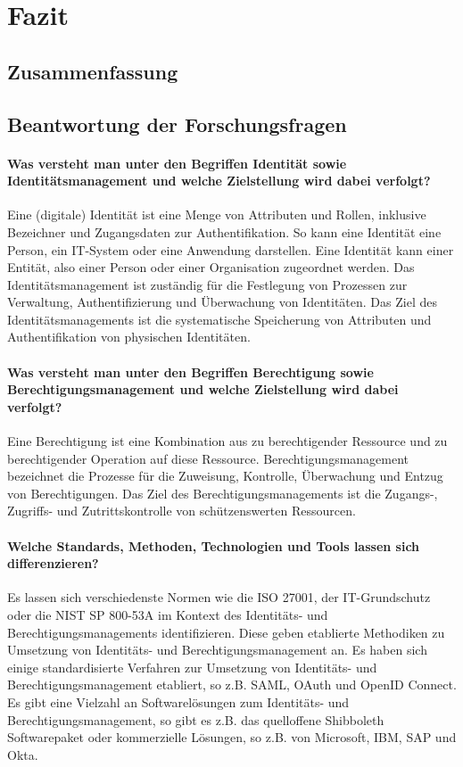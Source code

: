 \documentclass[11pt]{article}
\begin{document}
\section{Fazit}
\subsection{Zusammenfassung}
\subsection{Beantwortung der Forschungsfragen}
\paragraph{Was versteht man unter den Begriffen \glqq{}Identität\grqq{} sowie \glqq{}Identitätsmanagement\grqq{} und welche Zielstellung wird dabei verfolgt?}
Eine (digitale) Identität ist eine Menge von Attributen und Rollen, inklusive Bezeichner und Zugangsdaten zur Authentifikation. So kann eine Identität eine Person, ein IT-System oder eine Anwendung darstellen. Eine Identität kann einer Entität, also einer Person oder einer Organisation zugeordnet werden. Das Identitätsmanagement ist zuständig für die Festlegung von Prozessen zur Verwaltung, Authentifizierung und Überwachung von Identitäten. Das Ziel des Identitätsmanagements ist die systematische Speicherung von Attributen und Authentifikation von physischen Identitäten.
\paragraph{Was versteht man unter den Begriffen \glqq{}Berechtigung\grqq{} sowie \glqq{}Berechtigungsmanagement\grqq{} und welche Zielstellung wird dabei verfolgt?}
Eine Berechtigung ist eine Kombination aus zu berechtigender Ressource und zu berechtigender Operation auf diese Ressource. Berechtigungsmanagement bezeichnet die Prozesse für die Zuweisung, Kontrolle, Überwachung und Entzug von Berechtigungen. Das Ziel des Berechtigungsmanagements ist die Zugangs-, Zugriffs- und Zutrittskontrolle von schützenswerten Ressourcen.
\paragraph{Welche Standards, Methoden, Technologien und Tools lassen sich differenzieren?}
Es lassen sich verschiedenste Normen wie die ISO 27001, der IT-Grundschutz oder die NIST SP 800-53A im Kontext des Identitäts- und Berechtigungsmanagements identifizieren. Diese geben etablierte Methodiken zu Umsetzung von Identitäts- und Berechtigungsmanagement an. Es haben sich einige standardisierte Verfahren zur Umsetzung von Identitäts- und Berechtigungsmanagement etabliert, so z.B. SAML, OAuth und OpenID Connect. Es gibt eine Vielzahl an Softwarelösungen zum Identitäts- und Berechtigungsmanagement, so gibt es z.B. das quelloffene Shibboleth Softwarepaket oder kommerzielle Lösungen, so z.B. von Microsoft, IBM, SAP und Okta.
\end{document}
